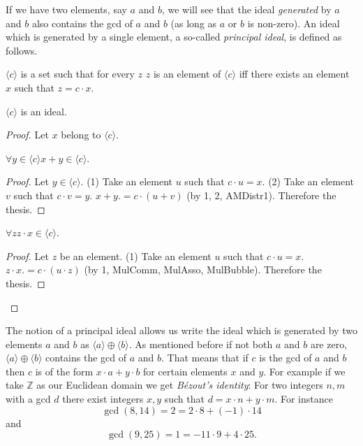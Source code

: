 \documentclass[english]{article}
\newcommand{\Int}{\mathbb{Z}}
\begin{document}
  If we have two elements, say $a$ and $b$, we will see that the ideal
  \textit{generated} by $a$ and $b$ also contains the gcd of $a$ and $b$ (as
  long as $a$ or $b$ is non-zero). An ideal which is generated by a single
  element, a so-called \textit{principal ideal}, is defined as follows.

  \begin{forthel}
    \begin{definition}\label{DefPrIdeal}
      $\langle c \rangle$ is a set such that for every $z$ $z$ is an element of
      $\langle c \rangle$ iff there exists an element $x$ such that
      $z = c \cdot x$.
    \end{definition}

    \begin{lemma}\label{PrIdeal}
      $\langle c \rangle$ is an ideal.
    \end{lemma}
    \begin{proof}
      Let $x$ belong to $\langle c \rangle$.

      $\forall y \in \langle c \rangle x + y \in \langle c \rangle$.
      \begin{proof}
        Let $y \in \langle c \rangle$.
        (1) Take an element $u$ such that $c \cdot u = x$.
        (2) Take an element $v$ such that $c \cdot v = y$.
        $x + y .= c \cdot (u + v)$ (by 1, 2, AMDistr1).
        Therefore the thesis.
      \end{proof}

      $\forall z z \cdot x \in \langle c \rangle$.
      \begin{proof}
        Let $z$ be an element.
        (1) Take an element $u$ such that $c \cdot u = x$.
        $z \cdot x .= c \cdot (u \cdot z)$ (by 1, MulComm, MulAsso, MulBubble).
        Therefore the thesis.
      \end{proof}
    \end{proof}
  \end{forthel}

  The notion of a principal ideal allows us write the ideal which is generated
  by two elements $a$ and $b$ as $\langle a \rangle \oplus \langle b \rangle$.
  As mentioned before if not both $a$ and $b$ are zero,
  $\langle a \rangle \oplus \langle b \rangle$ contains the gcd of $a$ and $b$.
  That means that if $c$ is the gcd of $a$ and $b$ then $c$ is of the form
  $x \cdot a + y \cdot b$ for certain elements $x$ and $y$. For example if we
  take $\Int$ as our Euclidean domain we get \textit{Bézout's identity}: For two
  integers $n,m$ with a gcd $d$ there exist integers $x,y$ such that
  $d = x \cdot n + y \cdot m$. For instance
  \[ \gcd(8,14) = 2 = 2 \cdot 8 + (-1) \cdot 14 \]
  and
  \[ \gcd(9,25) = 1 = -11 \cdot 9 + 4 \cdot 25. \]
\end{document}
